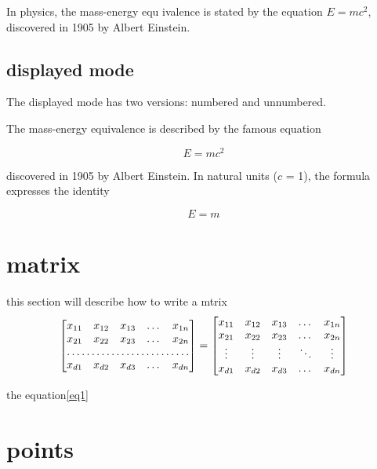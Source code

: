 In physics, the mass-energy equ
ivalence is stated 
by the equation \begin{math} E=mc^2 \end{math}, discovered in 1905 by Albert Einstein.

 
\subsection{displayed mode}
The displayed mode has two versions: numbered and unnumbered.


The mass-energy equivalence is described by the famous equation
 
$$E=mc^2$$
 
discovered in 1905 by Albert Einstein. 
In natural units ($c$ = 1), the formula expresses the identity
 
\begin{equation}
\label{eq1}
E=m
\end{equation}



\section{matrix}



this section will describe how to write  a mtrix\\

\begin{equation}
\begin{bmatrix}
    x_{11}       & x_{12} & x_{13} & \dots & x_{1n} \\
    x_{21}       & x_{22} & x_{23} & \dots & x_{2n} \\
    \hdotsfor{5} \\
    x_{d1}       & x_{d2} & x_{d3} & \dots & x_{dn}
\end{bmatrix}
=
\begin{bmatrix}
    x_{11} & x_{12} & x_{13} & \dots  & x_{1n} \\
    x_{21} & x_{22} & x_{23} & \dots  & x_{2n} \\
    \vdots & \vdots & \vdots & \ddots & \vdots \\
    x_{d1} & x_{d2} & x_{d3} & \dots  & x_{dn}
\end{bmatrix}
\end{equation}


the equation\ref{eq1} 

\section{ points}

